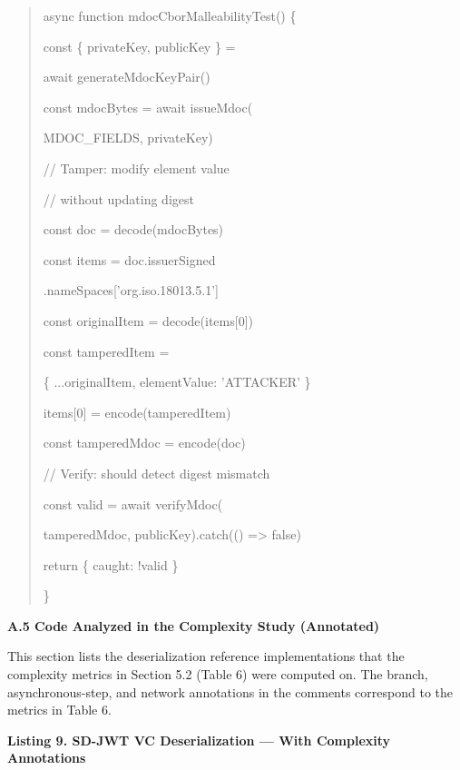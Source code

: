 \begin{quote}
async function mdocCborMalleabilityTest() \{

const \{ privateKey, publicKey \} =

await generateMdocKeyPair()

const mdocBytes = await issueMdoc(

MDOC\_FIELDS, privateKey)

// Tamper: modify element value

// without updating digest

const doc = decode(mdocBytes)

const items = doc.issuerSigned

.nameSpaces{[}'org.iso.18013.5.1'{]}

const originalItem = decode(items{[}0{]})

const tamperedItem =

\{ ...originalItem, elementValue: 'ATTACKER' \}

items{[}0{]} = encode(tamperedItem)

const tamperedMdoc = encode(doc)

// Verify: should detect digest mismatch

const valid = await verifyMdoc(

tamperedMdoc, publicKey).catch(() =\textgreater{} false)

return \{ caught: !valid \}

\}
\end{quote}

\textbf{A.5 Code Analyzed in the Complexity Study (Annotated)}

This section lists the deserialization reference implementations that the complexity metrics in Section 5.2 (Table 6) were computed on. The branch, asynchronous-step, and network annotations in the comments correspond to the metrics in Table 6.

\textbf{Listing 9. SD-JWT VC Deserialization --- With Complexity Annotations}


